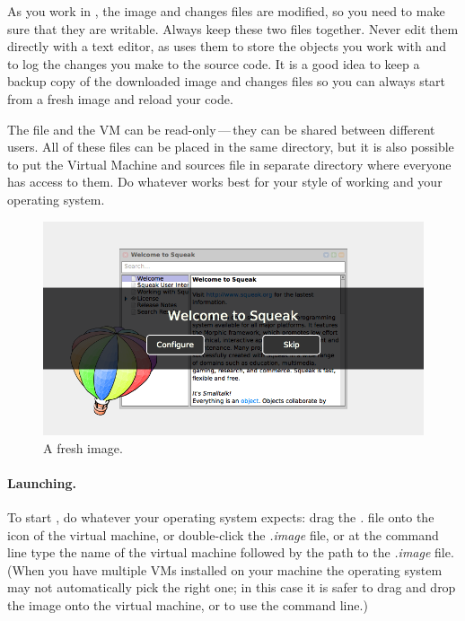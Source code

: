 \documentclass[a4paper,10pt,twoside]{book}
\begin{document}
As you work in \sq, the image and changes files are modified, so you need to make sure that they are writable.
Always keep these two files together.
Never edit them directly with a text editor, as \sq uses them to store the objects you work with and to log the changes you make to the source code.
It is a good idea to keep a backup copy of the downloaded image and changes files so you can always start from a fresh image and reload your code.

The  file and the VM can be read-only\,---\,they can be shared between different users.
All of these files can be placed in the same directory, but it is also possible to put the Virtual Machine and sources file in separate directory where everyone has access to them.
Do whatever works best for your style of working and your operating system.


\begin{figure}[htb]
\centerline {\includegraphics[width=\textwidth]{startup}}
\caption{A fresh \sbe image.\label{fig:startup}}
\end{figure}

\paragraph{Launching.} To start \sq, do whatever your operating system expects: drag the \emph{.} file onto the icon of the virtual machine, or double-click the \emph{.image} file, or  at the command line type the name of the virtual machine followed by the path to the \emph{.image} file. (When you have multiple VMs installed on your machine the operating system may not automatically pick the right one; in this case it is safer to drag and drop the image onto the virtual machine, or to use the command line.)
\end{document}
